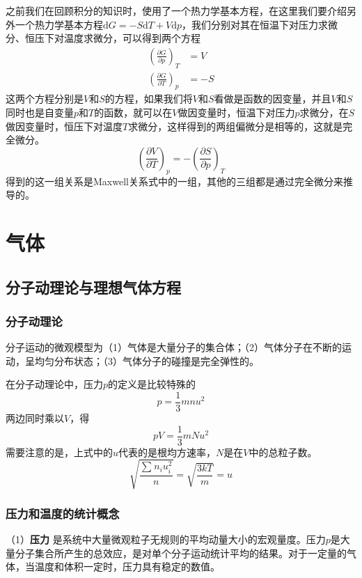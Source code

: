 \documentclass[lang=cn,newtx,11pt,scheme=chinese]{elegantbook}
\begin{document}
之前我们在回顾积分的知识时，使用了一个热力学基本方程，在这里我们要介绍另外一个热力学基本方程$\mathrm{d}G=-S\mathrm{d}T+V\mathrm{d}p$，我们分别对其在恒温下对压力求微分、恒压下对温度求微分，可以得到两个方程
\begin{equation}
	\begin{aligned}
		\left ( \frac{\partial G}{\partial p}  \right )_T &= V 
		\\[1.5ex]
		\left ( \frac{\partial G}{\partial T}  \right )_p &= -S
	\end{aligned}
\end{equation}
这两个方程分别是$V$和$S$的方程，如果我们将$V$和$S$看做是函数的因变量，并且$V$和$S$同时也是自变量$p$和$T$的函数，就可以在$V$做因变量时，恒温下对压力$p$求微分，在$S$做因变量时，恒压下对温度$T$求微分，这样得到的两组偏微分是相等的，这就是完全微分。
\begin{equation}
	\left ( \frac{\partial V}{\partial T}  \right )_p = -\left ( \frac{\partial S}{\partial p}  \right )_T
\end{equation}
得到的这一组关系是Maxwell关系式中的一组，其他的三组都是通过完全微分来推导的。

\chapter{气体}
\section{分子动理论与理想气体方程}
\subsection{分子动理论}
分子运动的微观模型为（1）气体是大量分子的集合体；（2）气体分子在不断的运动，呈均匀分布状态；（3）气体分子的碰撞是完全弹性的。

在分子动理论中，压力$p$的定义是比较特殊的
\begin{equation}
	p=\frac{1}{3}mnu^2
\end{equation}
两边同时乘以$V$，得
\begin{equation}
	pV=\frac{1}{3}mNu^2
\end{equation}
需要注意的是，上式中的$u$代表的是根均方速率，$N$是在$V$中的总粒子数。
\begin{equation}
	\sqrt{\displaystyle \frac{\sum_{}^{} n_iu_i^2}{n} } =\sqrt{\frac{3kT}{m}}=u
\end{equation}
\subsection{压力和温度的统计概念}
（1）\textbf{压力} \quad 是系统中大量微观粒子无规则的平均动量大小的宏观量度。压力$p$是大量分子集合所产生的总效应，是对单个分子运动统计平均的结果。对于一定量的气体，当温度和体积一定时，压力具有稳定的数值。
\end{document}
